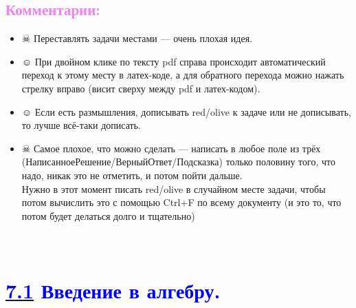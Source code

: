 \documentclass[12pt]{article}
\newcounter{num}
\newenvironment{mylist} %
{ \begin{itemize}
    \setlength{\itemsep}{0pt}
    \setlength{\parskip}{0pt}
    \setlength{\parsep}{0pt}     }
{ \end{itemize}                  }
\begin{document}
\subsection*{\textcolor{Violet}{\textbf{Комментарии:}}}%
\begin{mylist}
\item [$\skull$] Переставлять задачи местами --- очень плохая идея.

\item [$\smiley$] При двойном клике по тексту pdf справа происходит автоматический переход к этому месту в латех-коде, а для обратного перехода можно нажать стрелку вправо (висит сверху между pdf и латех-кодом).

\item [$\smiley$] Если есть размышления, дописывать red/olive к задаче или не дописывать, то лучше всё-таки дописать.

\item [$\skull$] Самое плохое, что можно сделать --- написать в любое поле из трёх (НаписанноеРешение/ВерныйОтвет/Подсказка) только половину того, что надо, никак это не отметить, и потом пойти дальше.\\ Нужно в этот момент писать red/olive в случайном месте задачи, чтобы потом вычислить это с помощью Ctrl+F по всему документу (и это то, что потом будет делаться долго и тщательно)
\end{mylist}

\newpage
\setcounter{num}{462}

\hypertarget{7.1}{{\centering\section*{\bigskip\\\textcolor{Blue}{\hyperlink{start2}{\textcolor{Blue}{7.1}} Введение в алгебру.}\vspace{-5mm}}}}
\end{document}

